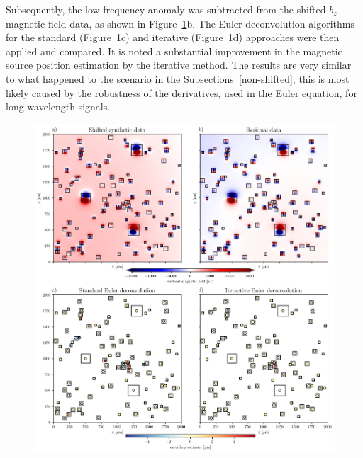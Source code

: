 Subsequently, the low-frequency anomaly was subtracted from the shifted $b_z$ magnetic field data, as shown in Figure~\ref{euler2}b. The Euler deconvolution algorithms for the standard (Figure~\ref{euler2}c) and iterative (Figure~\ref{euler2}d) approaches were then applied and compared. It is noted a substantial improvement in the magnetic source position estimation by the iterative method. The results are very similar to what happened to the scenario in the Subsections~\ref{non-shifted}, this is most likely caused by the robustness of the derivatives, used in the Euler equation, for long-wavelength signals.

\begin{figure}[tb!]
  \centering
  \includegraphics[width=1\linewidth]{figures/euler-comparion-2.png}
  \caption{
      }
  \label{euler2}
\end{figure}

